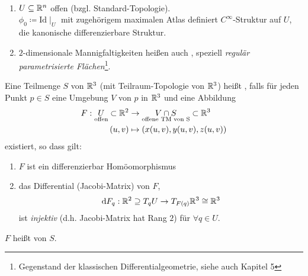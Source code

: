 \begin{example}
  \
  \begin{enumerate}
    \item $ U \subseteq \mathbb{R}^n $ offen (bzgl. Standard-Topologie). \\
      $ \phi_0 \coloneqq \text{Id}\mid_U $ mit zugehörigem maximalen Atlas definiert $ C^\infty $-Struktur auf $ U $, die kanonische differenzierbare Struktur.
    \item $ 2 $-dimensionale Mannigfaltigkeiten heißen auch \term{Flächen}\label{def:flaeche}, speziell \emph{regulär parametrisierte Flächen}\footnote{Gegenstand der klassischen Differentialgeometrie, siehe auch Kapitel 5}.
  \end{enumerate}
\end{example}

\begin{definition}
  Eine Teilmenge $ S $ von $ \mathbb{R}^3 $ (mit Teilraum-Topologie von $ \mathbb{R}^3 $) heißt \label{def:regulaereFlaeche}, falls für jeden Punkt $ p \in S $ eine Umgebung $ V $ von $ p $ in $ \mathbb{R}^3 $ und eine Abbildung
  \begin{align*}
    F : \underset{\text{offen}}{U} \subset \mathbb{R}^2 &\to \underset{\text{offene TM von S}}{V \cap S} \subset \mathbb{R}^3 \\
      (u,v) &\mapsto (x(u,v),y(u,v),z(u,v))
  \end{align*}
  existiert, so dass gilt:
  \begin{enumerate}
    \item $ F $ ist ein differenzierbar Homöomorphismus
    \item das Differential (Jacobi-Matrix) von $ F $,
    \begin{equation*}
       \text{d}F_q : \mathbb{R}^2 \supseteq T_qU \to T_{F(q)}\mathbb{R}^3 \cong \mathbb{R}^3
     \end{equation*} 
     ist \emph{injektiv} (d.h. Jacobi-Matrix hat Rang $ 2 $) für $ \forall q \in U $.
  \end{enumerate}
  $ F $ heißt \label{def:lokaleParametrisierung} von $ S $.
\end{definition}

